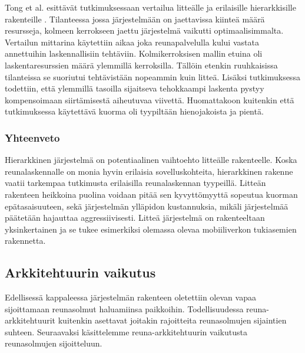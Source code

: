 Tong et al. esittävät tutkimuksessaan vertailua litteälle ja erilaisille hierarkkisille rakenteille \cite{tong2016hierarchical}. Tilanteessa jossa järjestelmään on jaettavissa kiinteä määrä resursseja, kolmeen kerrokseen jaettu järjestelmä vaikutti optimaalisimmalta.
Vertailun mittarina käytettiin aikaa joka reunapalvelulla kului vastata annettuihin laskennallisiin tehtäviin. Kolmikerroksisen mallin etuina oli laskentaresurssien määrä ylemmillä kerroksilla. Tällöin etenkin ruuhkaisissa tilanteissa se suoriutui tehtävistään nopeammin kuin litteä. Lisäksi tutkimuksessa todettiin, että ylemmillä tasoilla sijaitseva tehokkaampi laskenta pystyy kompensoimaan siirtämisestä aiheutuvaa viivettä. Huomattakoon kuitenkin että tutkimuksessa käytettävä kuorma oli tyypiltään hienojakoista ja pientä. 


\subsubsection{Yhteenveto}
Hierarkkinen järjestelmä on potentiaalinen vaihtoehto litteälle rakenteelle. Koska reunalaskennalle on monia hyvin erilaisia sovelluskohteita, hierarkkinen rakenne vaatii tarkempaa tutkimusta erilaisilla reunalaskennan tyypeillä. Litteän rakenteen heikkoina puolina voidaan pitää sen kyvyttömyyttä sopeutua kuorman epätasaisuuteen, sekä järjestelmän ylläpidon kustannuksia, mikäli järjestelmää päätetään hajauttaa aggressiivisesti. Litteä järjestelmä on rakenteeltaan yksinkertainen ja se tukee esimerkiksi olemassa olevaa mobiiliverkon tukiasemien rakennetta. 


\subsection{Arkkitehtuurin vaikutus}
Edellisessä kappaleessa järjestelmän rakenteen oletettiin olevan vapaa sijoittamaan reunasolmut haluamiinsa paikkoihin. 
Todellisuudessa reuna-arkkitehtuurit kuitenkin asettavat joitakin rajoitteita reunasolmujen sijaintien suhteen. Seuraavaksi käsittelemme reuna-arkkitehtuurin vaikutusta reunasolmujen sijoitteluun.

